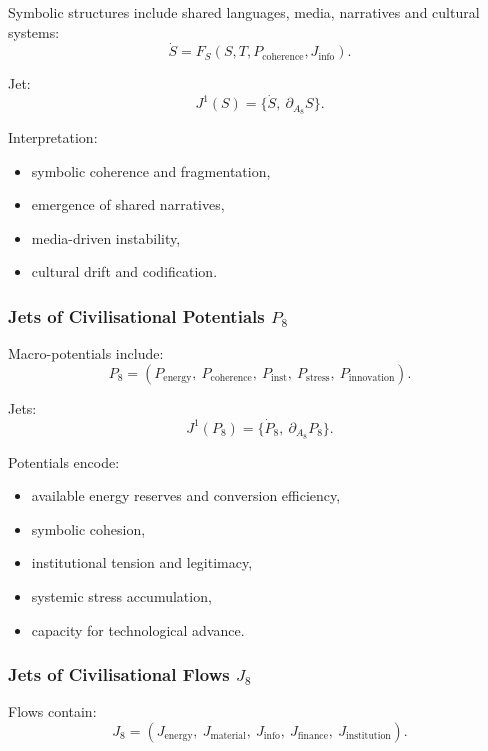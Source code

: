 Symbolic structures include shared languages, media, narratives and
cultural systems:
\[
\dot{S}=F_S(S, T, P_{\mathrm{coherence}}, J_{\mathrm{info}}).
\]

Jet:
\[
J^1(S)=\{\dot{S},\ \partial_{A_8}S\}.
\]

Interpretation:
\begin{itemize}
    \item symbolic coherence and fragmentation,
    \item emergence of shared narratives,
    \item media-driven instability,
    \item cultural drift and codification.
\end{itemize}


\subsubsection{Jets of Civilisational Potentials \texorpdfstring{$P_8$}{P_8}}

Macro-potentials include:
\[
P_8 = 
(P_{\mathrm{energy}},\ 
 P_{\mathrm{coherence}},\ 
 P_{\mathrm{inst}},\ 
 P_{\mathrm{stress}},\ 
 P_{\mathrm{innovation}}).
\]

Jets:
\[
J^1(P_8)=\{\dot{P}_8,\ \partial_{A_8}P_8\}.
\]

Potentials encode:
\begin{itemize}
    \item available energy reserves and conversion efficiency,
    \item symbolic cohesion,
    \item institutional tension and legitimacy,
    \item systemic stress accumulation,
    \item capacity for technological advance.
\end{itemize}


\subsubsection{Jets of Civilisational Flows \texorpdfstring{$J_8$}{J_8}}

Flows contain:
\[
J_8=
(J_{\mathrm{energy}},\ 
 J_{\mathrm{material}},\ 
 J_{\mathrm{info}},\ 
 J_{\mathrm{finance}},\ 
 J_{\mathrm{institution}}).
\]


